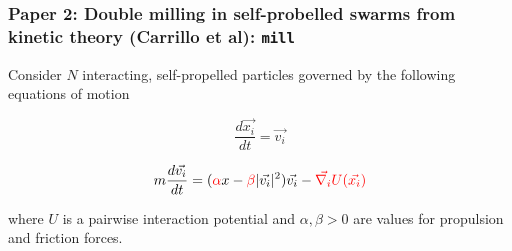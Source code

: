 \documentclass[compress]{beamer}
\begin{document}
\begin{frame}
	\frametitle{Paper 2: Double milling in self-probelled swarms from kinetic theory (Carrillo et al): \texttt{mill}}
	
%	  
	  
	Consider \( N \) interacting, self-propelled particles governed by the following equations of motion
	
	
	
	
\begin{equation}
		\frac{d\vec{x_{i}}}{d t} = \vec{v_{i}}
\end{equation}

\begin{equation}
		    m  \frac{d\vec{v_{i}}}{d t} = (\textcolor{red}{\alpha} x- \textcolor{red}{\beta} |\vec{v_{i}}|^{2}) \vec{v_{i}} - \textcolor{red}{\vec{\nabla_{i}} U(\vec{x_{i}})}
\end{equation}

	
	where \( U \) is a pairwise interaction potential and \( \alpha, \beta > 0\) are values for propulsion and friction forces.\\

\end{frame}
\end{document}
